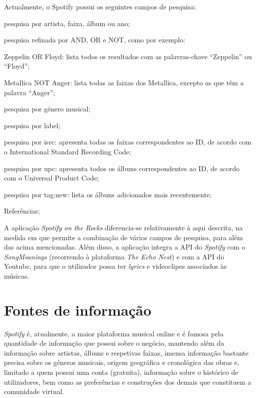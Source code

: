 \documentclass[twocolumn,twoside,11pt,a4paper]{article}
\begin{document}
Actualmente, o Spotify possui os seguintes campos de pesquisa:
\begin{compactitem}
  \item pesquisa por artista, faixa, álbum ou ano;
  \item pesquisa refinada por AND, OR e NOT, como por exemplo:
    \begin{compactitem}
      \item Zeppelin OR Floyd: lista todos os resultados com as palavras-chave
        “Zeppelin” ou “Floyd”;
      \item Metallica NOT Anger: lista todas as faixas dos Metallica, excepto as que têm
        a palavra “Anger”;
    \end{compactitem}
  \item pesquisa por género musical;
  \item pesquisa por label;
  \item pesquisa por isrc: apresenta todas as faixas correspondentes ao ID, de acordo com
    o International Standard Recording Code;
  \item pesquisa por upc: apresenta todos os álbuns correspondentes ao ID, de acordo com
    o Universal Product Code;
  \item pesquisa por tag:new: lista os álbuns adicionados mais recentemente;
  \item Referências;
\end{compactitem}


A aplicação \textit{Spotify on the Rocks} diferencia-se relativamente à aqui descrita,
na medida em que permite a combinação de vários campos de pesquisa, para além das
acima mencionadas.
Além disso, a aplicação integra a API do \textit{Spotify} com o \textit{SongMeanings}
(recorrendo à plataforma \textit{The Echo Nest}) e com a API do Youtube, para que o
utilizador possa ter \textit{lyrics} e videoclipes associados às músicas.



\section{Fontes de informação}\label{sec:sources}

\textit{Spotify} é, atualmente, a maior plataforma musical online e é famosa pela
quantidade de informação que possui sobre o negócio, mantendo além da informação
sobre artistas, álbuns e respetivas faixas, imensa informação bastante precisa sobre
os géneros musicais, origem geográfica e cronológica das obras e, limitado a quem
possui uma conta (gratuita), informação sobre o histórico de utilizadores, bem como as
preferências e construções dos demais que constituem a comunidade virtual.
\end{document}
